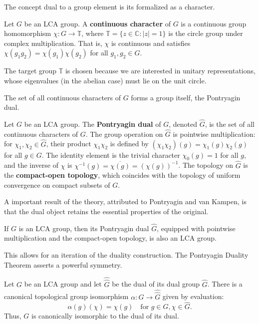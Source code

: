 The concept dual to a group element is its  formalized as a character.

\begin{definition}
Let $G$ be an LCA group. A \textbf{continuous character} of $G$ is a continuous group homomorphism $\chi: G \to \mathbb{T}$, where $\mathbb{T} = \{z \in \mathbb{C} : |z|=1\}$ is the circle group under complex multiplication. That is, $\chi$ is continuous and satisfies $\chi(g_1 g_2) = \chi(g_1) \chi(g_2)$ for all $g_1, g_2 \in G$.
\end{definition}
The target group $\mathbb{T}$ is chosen because we are interested in unitary representations, whose eigenvalues (in the abelian case) must lie on the unit circle.

The set of all continuous characters of $G$ forms a group itself, the Pontryagin dual.

\begin{definition}
Let $G$ be an LCA group. The \textbf{Pontryagin dual} of $G$, denoted $\hat{G}$, is the set of all continuous characters of $G$. The group operation on $\hat{G}$ is pointwise multiplication: for $\chi_1, \chi_2 \in \hat{G}$, their product $\chi_1 \chi_2$ is defined by $(\chi_1 \chi_2)(g) = \chi_1(g) \chi_2(g)$ for all $g \in G$. The identity element is the trivial character $\chi_0(g) = 1$ for all $g$, and the inverse of $\chi$ is $\chi^{-1}(g) = \overline{\chi(g)} = (\chi(g))^{-1}$.
The topology on $\hat{G}$ is the \textbf{compact-open topology}, which coincides with the topology of uniform convergence on compact subsets of $G$.
\end{definition}

A important result of the theory, attributed to Pontryagin and van Kampen, is that the dual object retains the essential properties of the original.

\begin{theorem}
If $G$ is an LCA group, then its Pontryagin dual $\hat{G}$, equipped with pointwise multiplication and the compact-open topology, is also an LCA group.
\end{theorem}

This allows for an iteration of the duality construction. The Pontryagin Duality Theorem asserts a powerful symmetry.

\begin{theorem}
Let $G$ be an LCA group and let $\hat{\hat{G}}$ be the dual of its dual group $\hat{G}$. There is a canonical topological group isomorphism $\alpha: G \to \hat{\hat{G}}$ given by evaluation:
\[ \alpha(g)(\chi) = \chi(g) \quad \text{for } g \in G, \chi \in \hat{G}. \]
Thus, $G$ is canonically isomorphic to the dual of its dual.
\end{theorem}

